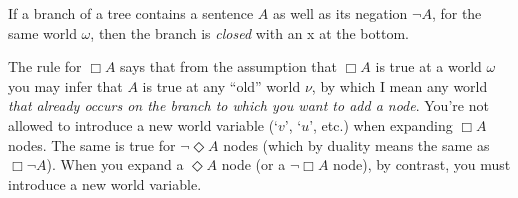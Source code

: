 \vspace{10mm}

\begin{minipage}{0.33\textwidth}\centering
{}
\end{minipage}
\begin{minipage}{0.33\textwidth}\centering
{}
\end{minipage}
\begin{minipage}{0.33\textwidth}\centering
{}
\end{minipage}

\vspace{10mm}

\begin{minipage}{0.33\textwidth}\centering
{}
\end{minipage}

\vspace{5mm}

If a branch of a tree contains a sentence $A$ as well as its negation $\neg A$,
for the same world $\omega$, then the branch is \emph{closed} with an {\sffamily
  x} at the bottom.

The rule for $\Box A$ says that from the assumption that $\Box A$ is true at a
world $\omega$ you may infer that $A$ is true at any ``old'' world $\nu$, by
which I mean any world \emph{that already occurs on the branch to which you want to add a node}. You're not allowed to introduce a new world variable (`$v$',
`$u$', etc.) when expanding $\Box A$ nodes. The same is true for
$\neg \Diamond A$ nodes (which by duality means the same as $\Box \neg A$). When
you expand a $\Diamond A$ node (or a $\neg \Box A$ node), by contrast, you must
introduce a new world variable.

